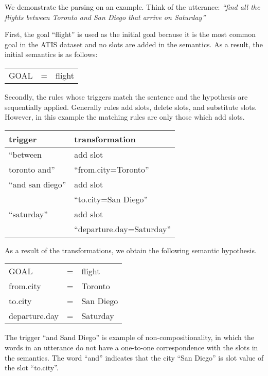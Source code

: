 \documentclass[11pt]{article}
\begin{document}
We demonstrate the parsing on an example. Think of the utterance: \textit{``find all the flights between Toronto and San Diego that arrive on Saturday''} 

First, the goal ``flight'' is used as the initial goal because it is the most common goal in the ATIS dataset and no slots are added in the semantics. As a result, the initial semantics is as follows:

\vspace{.25cm}
\begin{tabular}{lll}
  GOAL & = & flight
\end{tabular} 
\vspace{.25cm}

Secondly, the rules whose triggers match the sentence and the hypothesis are sequentially applied. Generally rules add slots, delete slots, and substitute slots. However, in this example the matching rules are only those which add slots.

\vspace{.25cm}
\begin{tabular}{ll}
  trigger & transformation \\
  \hline 
  ``between               & add slot \\
    toronto and''         &``from.city=Toronto'' \\
  ``and san diego''       & add slot \\
                          & ``to.city=San Diego'' \\
  ``saturday''            & add slot \\
                          & ``departure.day=Saturday'' \\
\end{tabular} 
\vspace{.25cm}

As a result of the transformations, we obtain the following semantic hypothesis. 

\vspace{.25cm}
\begin{tabular}{lll}
  GOAL          & = & flight \\
  from.city     & = & Toronto \\
  to.city       & = & San Diego \\
  departure.day & = & Saturday \\
\end{tabular} 
\vspace{.25cm}

The trigger ``and Sand Diego'' is example of non-compositionality, in which the words in an utterance do not have a one-to-one correspondence with the slots in the semantics. The word ``and'' indicates that the city ``San Diego'' is slot value of the slot ``to.city''. 
\end{document}
